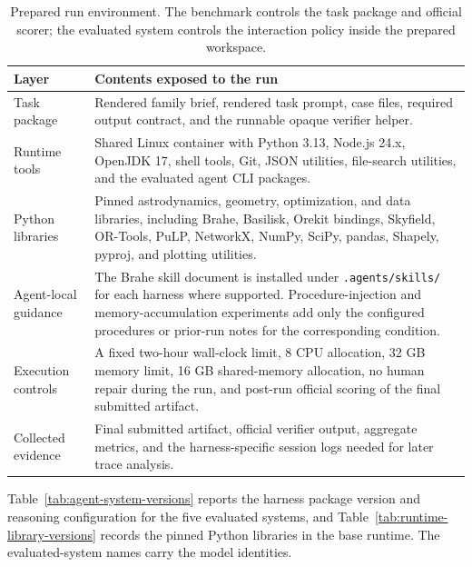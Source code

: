\documentclass[11pt]{article}
\begin{document}
\begin{table}[!t]
\centering
\footnotesize
\setlength{\tabcolsep}{4pt}
\begin{tabular}{>{\raggedright\arraybackslash}p{}>{\raggedright\arraybackslash}p{}}
\hline
\textbf{Layer} & \textbf{Contents exposed to the run} \\
\hline
Task package & Rendered family brief, rendered task prompt, case files, required output contract, and the runnable opaque verifier helper. \\
Runtime tools & Shared Linux container with Python 3.13, Node.js 24.x, OpenJDK 17, shell tools, Git, JSON utilities, file-search utilities, and the evaluated agent CLI packages. \\
Python libraries & Pinned astrodynamics, geometry, optimization, and data libraries, including Brahe, Basilisk, Orekit bindings, Skyfield, OR-Tools, PuLP, NetworkX, NumPy, SciPy, pandas, Shapely, pyproj, and plotting utilities. \\
Agent-local guidance & The Brahe skill document is installed under \texttt{.agents/skills/} for each harness where supported. Procedure-injection and memory-accumulation experiments add only the configured procedures or prior-run notes for the corresponding condition. \\
Execution controls & A fixed two-hour wall-clock limit, 8 CPU allocation, 32 GB memory limit, 16 GB shared-memory allocation, no human repair during the run, and post-run official scoring of the final submitted artifact. \\
Collected evidence & Final submitted artifact, official verifier output, aggregate metrics, and the harness-specific session logs needed for later trace analysis. \\
\hline
\end{tabular}
\caption{Prepared run environment. The benchmark controls the task package and official scorer; the evaluated system controls the interaction policy inside the prepared workspace.}
\label{tab:workspace-environment}
\end{table}

Table~\ref{tab:agent-system-versions} reports the harness package version and reasoning configuration for the five evaluated systems, and Table~\ref{tab:runtime-library-versions} records the pinned Python libraries in the base runtime. The evaluated-system names carry the model identities.
\end{document}
